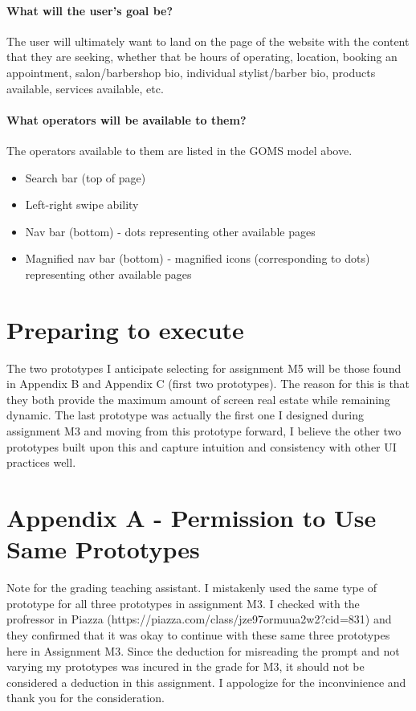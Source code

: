 \paragraph{What will the user’s goal be?} The user will ultimately want to land on the page of the website with the content that they are seeking, whether that be hours of operating, location, booking an appointment, salon/barbershop bio, individual stylist/barber bio, products available, services available, etc.

\paragraph{What operators will be available to them?} The operators available to them are listed in the GOMS model above.

\begin{itemize}
\item
  Search bar (top of page)
\item
  Left-right swipe ability
\item
  Nav bar (bottom) - dots representing other available pages
\item
  Magnified nav bar (bottom) - magnified icons (corresponding to dots) representing other available pages
\end{itemize}

\section{Preparing to execute}
The two prototypes I anticipate selecting for assignment M5 will be those found in Appendix B and Appendix C (first two prototypes). The reason for this is that they both provide the maximum amount of screen real estate while remaining dynamic. The last prototype was actually the first one I designed during assignment M3 and moving from this prototype forward, I believe the other two prototypes built upon this and capture intuition and consistency with other UI practices well.

\clearpage

\section{Appendix A - Permission to Use Same Prototypes}

Note for the grading teaching assistant. I mistakenly used the same type of prototype for all three prototypes in assignment M3. I checked with the profressor in Piazza (https://piazza.com/class/jze97ormuua2w2?cid=831) and they confirmed that it was okay to continue with these same three prototypes here in Assignment M3. Since the deduction for misreading the prompt and not varying my prototypes was incured in the grade for M3, it should not be considered a deduction in this assignment. I appologize for the inconvinience and thank you for the consideration.


